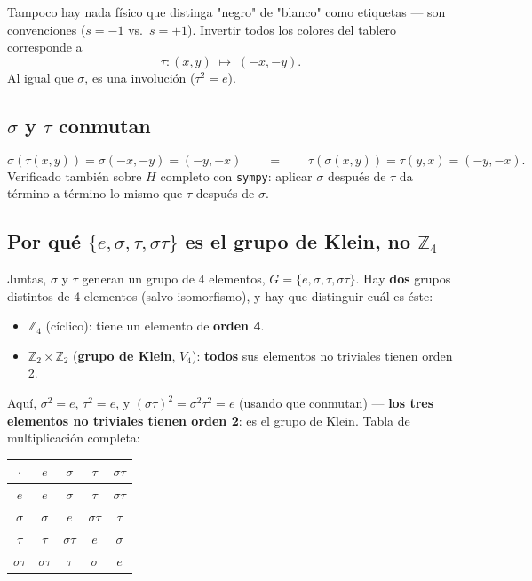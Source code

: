 \documentclass[11pt, a4paper]{article}
\begin{document}
Tampoco hay nada f\'isico que distinga "negro" de "blanco" como
etiquetas --- son convenciones ($s=-1$ vs.\ $s=+1$). Invertir todos los
colores del tablero corresponde a
\[
\tau: (x,y) \;\longmapsto\; (-x,-y).
\]
Al igual que $\sigma$, es una involuci\'on ($\tau^2=e$).

\subsection{$\sigma$ y $\tau$ conmutan}

\[
\sigma(\tau(x,y)) = \sigma(-x,-y) = (-y,-x)
\qquad = \qquad
\tau(\sigma(x,y)) = \tau(y,x) = (-y,-x).
\]
Verificado tambi\'en sobre $H$ completo con \texttt{sympy}: aplicar
$\sigma$ despu\'es de $\tau$ da t\'ermino a t\'ermino lo mismo que
$\tau$ despu\'es de $\sigma$.

\subsection{Por qu\'e $\{e,\sigma,\tau,\sigma\tau\}$ es el grupo de Klein, no $\mathbb{Z}_4$}
\label{sec:klein}

Juntas, $\sigma$ y $\tau$ generan un grupo de 4 elementos,
$G=\{e,\sigma,\tau,\sigma\tau\}$. Hay \textbf{dos} grupos distintos de
4 elementos (salvo isomorfismo), y hay que distinguir cu\'al es \'este:

\begin{itemize}
  \item $\mathbb{Z}_4$ (c\'iclico): tiene un elemento de \textbf{orden 4}.
  \item $\mathbb{Z}_2\times\mathbb{Z}_2$ (\textbf{grupo de Klein}, $V_4$):
        \textbf{todos} sus elementos no triviales tienen orden 2.
\end{itemize}

Aqu\'i, $\sigma^2=e$, $\tau^2=e$, y $(\sigma\tau)^2=\sigma^2\tau^2=e$
(usando que conmutan) --- \textbf{los tres elementos no triviales
tienen orden 2}: es el grupo de Klein. Tabla de multiplicaci\'on
completa:

\medskip
\begin{center}
\begin{tabular}{c|cccc}
  $\cdot$ & $e$ & $\sigma$ & $\tau$ & $\sigma\tau$ \\
  \hline
  $e$          & $e$          & $\sigma$      & $\tau$        & $\sigma\tau$ \\
  $\sigma$     & $\sigma$     & $e$           & $\sigma\tau$  & $\tau$ \\
  $\tau$       & $\tau$       & $\sigma\tau$  & $e$           & $\sigma$ \\
  $\sigma\tau$ & $\sigma\tau$ & $\tau$        & $\sigma$      & $e$ \\
\end{tabular}
\end{center}
\medskip
\end{document}
